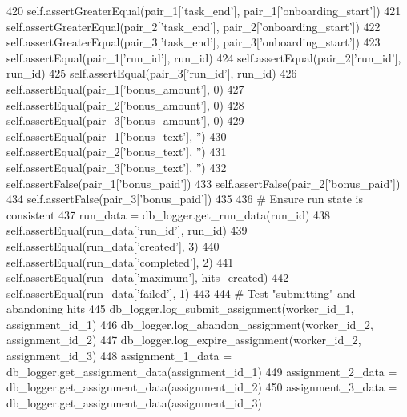 \begin{DoxyCode}
420         self.assertGreaterEqual(pair\_1[\textcolor{stringliteral}{'task\_end'}], pair\_1[\textcolor{stringliteral}{'onboarding\_start'}])
421         self.assertGreaterEqual(pair\_2[\textcolor{stringliteral}{'task\_end'}], pair\_2[\textcolor{stringliteral}{'onboarding\_start'}])
422         self.assertGreaterEqual(pair\_3[\textcolor{stringliteral}{'task\_end'}], pair\_3[\textcolor{stringliteral}{'onboarding\_start'}])
423         self.assertEqual(pair\_1[\textcolor{stringliteral}{'run\_id'}], run\_id)
424         self.assertEqual(pair\_2[\textcolor{stringliteral}{'run\_id'}], run\_id)
425         self.assertEqual(pair\_3[\textcolor{stringliteral}{'run\_id'}], run\_id)
426         self.assertEqual(pair\_1[\textcolor{stringliteral}{'bonus\_amount'}], 0)
427         self.assertEqual(pair\_2[\textcolor{stringliteral}{'bonus\_amount'}], 0)
428         self.assertEqual(pair\_3[\textcolor{stringliteral}{'bonus\_amount'}], 0)
429         self.assertEqual(pair\_1[\textcolor{stringliteral}{'bonus\_text'}], \textcolor{stringliteral}{''})
430         self.assertEqual(pair\_2[\textcolor{stringliteral}{'bonus\_text'}], \textcolor{stringliteral}{''})
431         self.assertEqual(pair\_3[\textcolor{stringliteral}{'bonus\_text'}], \textcolor{stringliteral}{''})
432         self.assertFalse(pair\_1[\textcolor{stringliteral}{'bonus\_paid'}])
433         self.assertFalse(pair\_2[\textcolor{stringliteral}{'bonus\_paid'}])
434         self.assertFalse(pair\_3[\textcolor{stringliteral}{'bonus\_paid'}])
435 
436         \textcolor{comment}{# Ensure run state is consistent}
437         run\_data = db\_logger.get\_run\_data(run\_id)
438         self.assertEqual(run\_data[\textcolor{stringliteral}{'run\_id'}], run\_id)
439         self.assertEqual(run\_data[\textcolor{stringliteral}{'created'}], 3)
440         self.assertEqual(run\_data[\textcolor{stringliteral}{'completed'}], 2)
441         self.assertEqual(run\_data[\textcolor{stringliteral}{'maximum'}], hits\_created)
442         self.assertEqual(run\_data[\textcolor{stringliteral}{'failed'}], 1)
443 
444         \textcolor{comment}{# Test "submitting" and abandoning hits}
445         db\_logger.log\_submit\_assignment(worker\_id\_1, assignment\_id\_1)
446         db\_logger.log\_abandon\_assignment(worker\_id\_2, assignment\_id\_2)
447         db\_logger.log\_expire\_assignment(worker\_id\_2, assignment\_id\_3)
448         assignment\_1\_data = db\_logger.get\_assignment\_data(assignment\_id\_1)
449         assignment\_2\_data = db\_logger.get\_assignment\_data(assignment\_id\_2)
450         assignment\_3\_data = db\_logger.get\_assignment\_data(assignment\_id\_3)

\end{DoxyCode}
